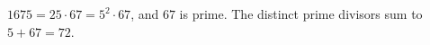 $1675=25\cdot67=5^2\cdot67$, and $67$ is prime. The distinct prime divisors sum to $5+67=\boxed{72}$.
